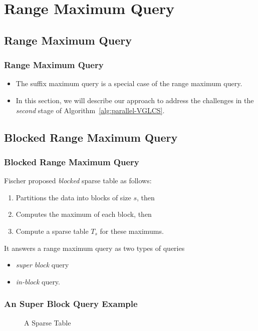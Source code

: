 \section{Range Maximum Query}

\subsection{Range Maximum Query}
\begin{frame}
    \frametitle{Range Maximum Query}
    \begin{itemize}
    	\setlength\itemsep{1em}
    	\item 
    		The suffix maximum query is a special case of the range
			maximum query.
		\item
			In this section, we will describe our approach to address
			the challenges in the {\em second} stage of
			Algorithm~\ref{alg:parallel-VGLCS}.
    \end{itemize}
\end{frame}

\subsection{Blocked Range Maximum Query}
\begin{frame}
    \frametitle{Blocked Range Maximum Query}
	Fischer proposed {\em blocked} sparse table as follows:
	\begin{enumerate}
		\setlength\itemsep{1em}
		\item
			Partitions the data into blocks of size $s$, then
		\item
			Computes the maximum of each block, then
		\item
			Compute a sparse table $T_s$ for these maximums.
	\end{enumerate}
	\vspace{1em}
	It answers a range maximum query as two types of queries 
	\begin{itemize}
		\setlength\itemsep{1em}
		\item
			{\em super block} query
		\item
			{\em in-block} query.
	\end{itemize}
\end{frame}

\begin{withoutheadline}
\begin{frame}
    \frametitle{An Super Block Query Example}
	\begin{figure}[!thb]
		\centering {} 
	  	\caption{A Sparse Table}
	  	\label{fig:block-interval-decomposition}
	\end{figure}
\end{frame}
\end{withoutheadline}


